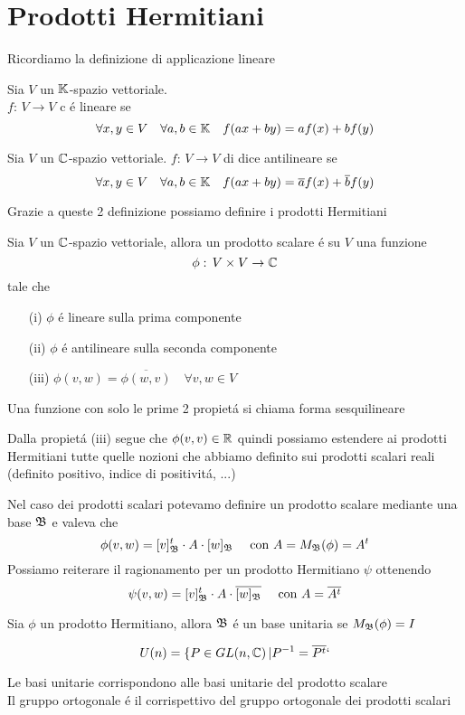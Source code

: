 %
%
\section{Prodotti Hermitiani}
Ricordiamo la definizione di applicazione lineare
\begin{defn} [Lineare]\bianco
Sia $V$ un $\mathbb{K}$-spazio vettoriale.\\
$f:\, V \to V $ c \'e lineare se 
$$ \forall x,y \in V \quad \forall a, b \in \mathbb{K} \quad f(ax+by) = a f(x) + b f(y)$$
\end{defn}
\spazio
\begin{defn}[Antilineare]\bianco
Sia $V$ un $\mathbb{C}$-spazio vettoriale.
$ f:\, V \to V $ di dice antilineare se 
$$ \forall x,y \in V \quad \forall a, b \in \mathbb{K} \quad f(ax+by) = \overline{a}f(x) + \overline{b} f(y)$$
\end{defn}
\spazio
Grazie a queste 2 definizione possiamo definire i prodotti Hermitiani
\begin{defn}\bianco
Sia $V$ un $\mathbb{C}$-spazio vettoriale, allora
un prodotto scalare \'e su $V$ una funzione
$$ \phi:\, V \times V \to \mathbb{C}$$ 
tale che
\begin{itemize}
\item[(i)] $\phi$ \'e lineare sulla prima componente
\item[(ii)] $\phi$ \'e antilineare sulla seconda componente
\item[(iii)] $\phi(v,w) = \overline{\phi(w,v)} \quad \forall v,w \in V $
\end{itemize}
\end{defn}
\begin{defn}[Sesquilineare]\bianco
Una funzione con solo le  prime 2 propiet\'a si chiama  forma sesquilineare
\end{defn}
\spazio
\begin{oss} Dalla propiet\'a (iii) segue che $\phi(v,v) \in \mathbb{R}$ quindi possiamo estendere ai prodotti Hermitiani tutte quelle nozioni che abbiamo definito sui prodotti scalari reali (definito positivo, indice di positivit\'a, ...)
\end{oss}
\spazio
Nel caso dei prodotti scalari potevamo definire un prodotto scalare mediante una base $\mathfrak{B}$ e valeva che 
$$ \phi(v,w) = [v]^t_{\mathfrak{B}} \cdot A \cdot [w]_{\mathfrak{B}} \quad \text{ con } 
A=M_{\mathfrak{B}}(\phi)=A^t$$
Possiamo reiterare il ragionamento per un prodotto Hermitiano $\psi$ ottenendo
$$ \psi(v,w)= [v]^t_{\mathfrak{B}} \cdot A \cdot \overline{[w]_{\mathfrak{B}}} \quad \text{ con } A = \overline{A^t}$$
\spazio
\begin{defn}\bianco
Sia $\phi$ un prodotto Hermitiano, allora $\mathfrak{B}$ \'e un base unitaria se $M_{\mathfrak{B}} (\phi)=I $ 

\end{defn}
\spazio
\begin{defn}
$$ U(n) = \{ P \in GL(n,\mathbb{C}) \, \vert P^{-1}=\overline{P^t}`$$

\end{defn}
\begin{oss}Le basi unitarie corrispondono alle basi unitarie del prodotto scalare\\
Il gruppo ortogonale \'e il corrispettivo del gruppo ortogonale dei prodotti scalari
\end{oss}
\newpage
